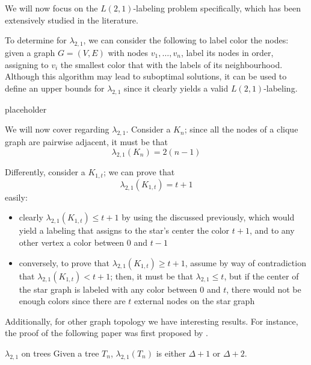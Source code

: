 \documentclass[a4paper, 12pt]{report}
\begin{document}
    We will now focus on the $L(2,1)$-labeling problem specifically, which has been extensively studied in the literature.

    To determine  for $\lambda_{2,1}$, we can consider the following  to label color the nodes: given a graph $G = (V, E)$ with nodes $v_1, \ldots, v_n$, label its nodes in order, assigning to $v_i$ the smallest color that  with the labels of its neighbourhood. Although this algorithm may lead to suboptimal solutions, it can be used to define an upper bounds for $\lambda_{2, 1}$ since it clearly yields a valid $L(2,1)$-labeling.

    placeholder 

    We will now cover  regarding $\lambda_{2,1}$. Consider a  $K_n$; since all the nodes of a clique graph are pairwise adjacent, it must be that $$\lambda_{2, 1}(K_n) = 2(n - 1)$$

    Differently, consider a \href{https://en.wikipedia.org/wiki/Star_(graph_theory)}{} $K_{1, t}$; we can prove that $$\lambda_{2,1}(K_{1,t}) = t + 1$$ easily:

    \begin{itemize}
        \item clearly $\lambda_{2,1}(K_{1,t}) \le t + 1$ by using the  discussed previously, which would yield a labeling that assigns to the star's center the color $t + 1$, and to any other vertex a color between $0$ and $t - 1$
        \item conversely, to prove that $\lambda_{2,1}(K_{1,t}) \ge t + 1$, assume by way of contradiction that $\lambda_{2,1}(K_{1,t}) < t + 1$; then, it must be that $\lambda_{2,1} \le t$, but if the center of the star graph is labeled with any color between 0 and $t$, there would not be enough colors since there are $t$ external nodes on the star graph
    \end{itemize}
    
    Additionally, for other graph topology we have interesting results. For instance, the proof of the following paper was first proposed by \textcite{griggs}.

    \begin{framedthm}[label={lambda trees}]{$\lambda_{2,1}$ on trees}
        Given a tree $T_n$, $\lambda_{2,1}(T_n)$ is either $\Delta + 1$ or $\Delta + 2$.
    \end{framedthm}
\end{document}
